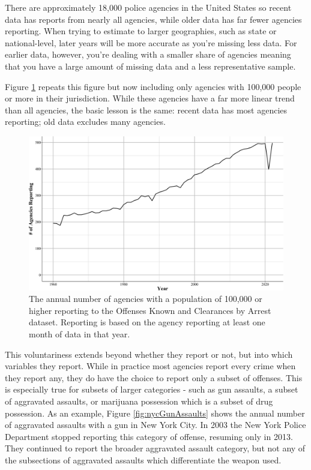 \documentclass[
  12pt,
  openany]{book}
\begin{document}
There are approximately 18,000 police agencies in the United States so recent data has reports from nearly all agencies, while older data has far fewer agencies reporting. When trying to estimate to larger geographies, such as state or national-level, later years will be more accurate as you're missing less data. For earlier data, however, you're dealing with a smaller share of agencies meaning that you have a large amount of missing data and a less representative sample.

Figure \ref{fig:bigAgenciesReporting} repeats this figure but now including only agencies with 100,000 people or more in their jurisdiction. While these agencies have a far more linear trend than all agencies, the basic lesson is the same: recent data has most agencies reporting; old data excludes many agencies.

\begin{figure}

{\centering \includegraphics[width=0.9\linewidth]{ucrbook_files/figure-latex/bigAgenciesReporting-1} 

}

\caption{The annual number of agencies with a population of 100,000 or higher reporting to the Offenses Known and Clearances by Arrest dataset. Reporting is based on the agency reporting at least one month of data in that year.}\label{fig:bigAgenciesReporting}
\end{figure}

This voluntariness extends beyond whether they report or not, but into which variables they report. While in practice most agencies report every crime when they report any, they do have the choice to report only a subset of offenses. This is especially true for subsets of larger categories - such as gun assaults, a subset of aggravated assaults, or marijuana possession which is a subset of drug possession. As an example, Figure \ref{fig:nycGunAssaults} shows the annual number of aggravated assaults with a gun in New York City. In 2003 the New York Police Department stopped reporting this category of offense, resuming only in 2013. They continued to report the broader aggravated assault category, but not any of the subsections of aggravated assaults which differentiate the weapon used.
\end{document}
